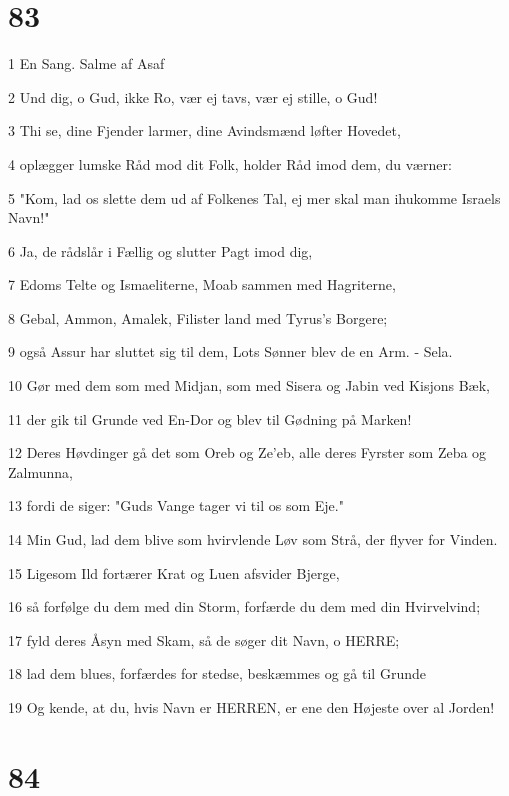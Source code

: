 \chapter{83}

\par 1 En Sang. Salme af Asaf
\par 2 Und dig, o Gud, ikke Ro, vær ej tavs, vær ej stille, o Gud!
\par 3 Thi se, dine Fjender larmer, dine Avindsmænd løfter Hovedet,
\par 4 oplægger lumske Råd mod dit Folk, holder Råd imod dem, du værner:
\par 5 "Kom, lad os slette dem ud af Folkenes Tal, ej mer skal man ihukomme Israels Navn!"
\par 6 Ja, de rådslår i Fællig og slutter Pagt imod dig,
\par 7 Edoms Telte og Ismaeliterne, Moab sammen med Hagriterne,
\par 8 Gebal, Ammon, Amalek, Filister land med Tyrus's Borgere;
\par 9 også Assur har sluttet sig til dem, Lots Sønner blev de en Arm. - Sela.
\par 10 Gør med dem som med Midjan, som med Sisera og Jabin ved Kisjons Bæk,
\par 11 der gik til Grunde ved En-Dor og blev til Gødning på Marken!
\par 12 Deres Høvdinger gå det som Oreb og Ze'eb, alle deres Fyrster som Zeba og Zalmunna,
\par 13 fordi de siger: "Guds Vange tager vi til os som Eje."
\par 14 Min Gud, lad dem blive som hvirvlende Løv som Strå, der flyver for Vinden.
\par 15 Ligesom Ild fortærer Krat og Luen afsvider Bjerge,
\par 16 så forfølge du dem med din Storm, forfærde du dem med din Hvirvelvind;
\par 17 fyld deres Åsyn med Skam, så de søger dit Navn, o HERRE;
\par 18 lad dem blues, forfærdes for stedse, beskæmmes og gå til Grunde
\par 19 Og kende, at du, hvis Navn er HERREN, er ene den Højeste over al Jorden!

\chapter{84}

